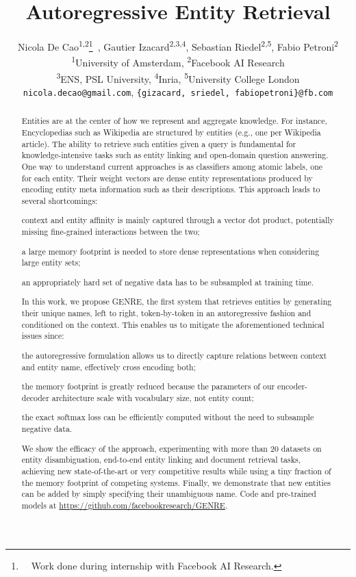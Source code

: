 \documentclass{article} \usepackage{main,times}
\title{Autoregressive Entity Retrieval}
\author{Nicola De Cao\textsuperscript{1,2}\thanks{~~Work done during internship with Facebook AI Research.}~, Gautier Izacard\textsuperscript{2,3,4}, Sebastian Riedel\textsuperscript{2,5}, Fabio Petroni\textsuperscript{2}\\
\textsuperscript{1}University of Amsterdam, 
\textsuperscript{2}Facebook AI Research \\
\textsuperscript{3}ENS, PSL University,
\textsuperscript{4}Inria, 
\textsuperscript{5}University College London\\
\texttt{nicola.decao@gmail.com},
\texttt{\{gizacard, sriedel, fabiopetroni\}@fb.com}
}
\makeatletter
\def\genre{\textsc{GENRE}\@\xspace}
\makeatother
\begin{document}
\maketitle
\begin{abstract}

Entities are at the center of how we represent and aggregate knowledge. For instance, Encyclopedias such as Wikipedia are structured by entities (e.g., one per Wikipedia article). The ability to retrieve such entities given a query is fundamental for knowledge-intensive tasks such as entity linking and open-domain question answering. 
One way to understand current approaches is as classifiers among atomic labels, one for each entity. Their weight vectors are dense entity representations produced by encoding entity meta information such as their descriptions. This approach leads to several shortcomings:
\begin{enumerate*}[label=(\roman*)] 
\item context and entity affinity is mainly captured through a vector dot product, potentially missing fine-grained interactions between the two;
\item a large memory footprint 
is needed to store dense representations when considering large entity sets;
\item an appropriately hard set of negative data has to be subsampled at training time.
\end{enumerate*}
In this work, we propose \genre, the first system that retrieves entities by generating their unique names, left to right, token-by-token in an autoregressive fashion and conditioned on the context. 
This enables us to mitigate the aforementioned technical issues since:
\begin{enumerate*}[label=(\roman*)] 
\item the autoregressive formulation allows us to directly capture relations between context and entity name, effectively cross encoding both;
\item the memory footprint is greatly reduced because the parameters of our encoder-decoder architecture scale with vocabulary size, not entity count;
\item the exact softmax loss can be efficiently computed without the need to subsample negative data.
\end{enumerate*}
We show the efficacy of the approach, experimenting with more than 20 datasets on entity disambiguation, end-to-end entity linking and document retrieval tasks, achieving new state-of-the-art or very competitive results while using a tiny fraction of the memory footprint of competing systems.
Finally, we demonstrate that new entities can be added by simply specifying their unambiguous name. Code and pre-trained models at \url{https://github.com/facebookresearch/GENRE}.











 \end{abstract}
\end{document}
